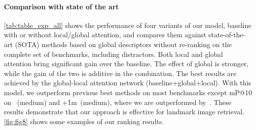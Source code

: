 
\paragraph{Comparison with state of the art}

\autoref{tab:table_exp_all} shows the performance of four variants of our model, \ie baseline with or without local/global attention, and compares them against state-of-the-art (SOTA) methods based on global descriptors without re-ranking on the complete set of benchmarks, including distractors. Both local and global attention bring significant gain over the baseline. The effect of global is stronger, while the gain of the two is additive in the combination. The best results are achieved by the global-local attention network (baseline+global+local). With this model, we outperform previous best methods on most benchmarks except mP@10 on \rpar~(medium) and \rpar$+$\r1m~(medium), where we are outperformed by~\cite{Radenovic01, RITAC18}. These results demonstrate that our approach is effective for landmark image retrieval. \autoref{fig:fig8} shows some examples of our ranking results.
